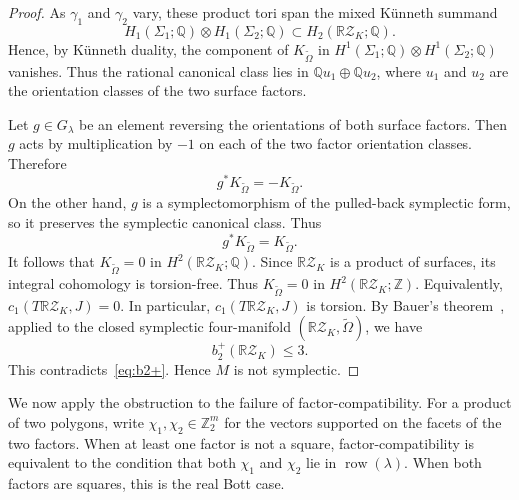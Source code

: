 \documentclass{amsart}
\numberwithin{equation}{section}
\theoremstyle{definition}
\theoremstyle{remark}
\newcommand{\Z}{\mathbb Z}
\newcommand{\Q}{\mathbb Q}
\newcommand{\RZ}{\mathbb R\mathcal Z}
\DeclareMathOperator{\row}{row}
\begin{document}
\begin{proof}
    As $\gamma_1$ and $\gamma_2$ vary, these product tori span the mixed K\"unneth summand
    $$
        H_1(\Sigma_1;\Q)\otimes H_1(\Sigma_2;\Q) \subset H_2(\RZ_K;\Q).
    $$
    Hence, by K\"unneth duality, the component of $K_{\widetilde\Omega}$ in $H^1(\Sigma_1;\Q)\otimes H^1(\Sigma_2;\Q)$ vanishes.
    Thus the rational canonical class lies in $\Q u_1\oplus \Q u_2$, where $u_1$ and $u_2$ are the orientation classes of the two surface factors.
    
    Let $g \in G_\lambda$ be an element reversing the orientations of both surface factors.
    Then $g$ acts by multiplication by $-1$ on each of the two factor orientation classes.
    Therefore
    $$
        g^\ast K_{\widetilde\Omega}=-K_{\widetilde\Omega}.
    $$
    On the other hand, $g$ is a symplectomorphism of the pulled-back symplectic form, so it preserves the symplectic canonical class.
    Thus
    $$
        g^\ast K_{\widetilde\Omega}=K_{\widetilde\Omega}.
    $$
    It follows that $K_{\widetilde\Omega}=0$ in $H^2(\RZ_K;\Q)$.
    Since $\RZ_K$ is a product of surfaces, its integral cohomology is torsion-free. 
    Thus $K_{\widetilde\Omega}=0$ in $H^2(\RZ_K;\Z)$.    
    Equivalently, $c_1(T\RZ_K,J)=0$.
    In particular, $c_1(T\RZ_K,J)$ is torsion.
    By Bauer's theorem~\cite[Corollary~1.2]{Bauer2008}, applied to the closed symplectic four-manifold $(\RZ_K,\widetilde\Omega)$, we have
    $$
        b_2^+(\RZ_K)\le 3.
    $$
    This contradicts~\eqref{eq:b2+}.
    Hence $M$ is not symplectic.
\end{proof}

We now apply the obstruction to the failure of factor-compatibility.
For a product of two polygons, write $\chi_1,\chi_2\in \Z_2^m$ for the vectors supported on the facets of the two factors.
When at least one factor is not a square, factor-compatibility is equivalent to the condition that both $\chi_1$ and $\chi_2$ lie in $\row(\lambda)$.
When both factors are squares, this is the real Bott case.
\end{document}

